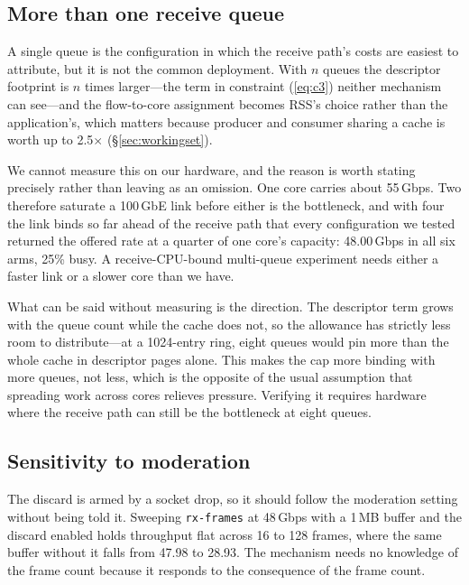 \documentclass[letterpaper,twocolumn,10pt]{article}
\newcommand{\rxframes}{\texttt{rx-frames}\xspace}
\begin{document}


\subsection{More than one receive queue}

A single queue is the configuration in which the receive path's costs are
easiest to attribute, but it is not the common deployment. With $n$ queues the
descriptor footprint is $n$ times larger---the term in constraint (\ref{eq:c3})
neither mechanism can see---and the flow-to-core assignment becomes RSS's choice
rather than the application's, which matters because producer and consumer
sharing a cache is worth up to 2.5$\times$ (\S\ref{sec:workingset}).

We cannot measure this on our hardware, and the reason is worth stating
precisely rather than leaving as an omission. One core carries about 55\,Gbps.
Two therefore saturate a 100\,GbE link before either is the bottleneck, and with
four the link binds so far ahead of the receive path that every configuration we
tested returned the offered rate at a quarter of one core's capacity: 48.00\,Gbps
in all six arms, 25\% busy. A receive-CPU-bound multi-queue experiment needs
either a faster link or a slower core than we have.

What can be said without measuring is the direction. The descriptor term grows
with the queue count while the cache does not, so the allowance has strictly
less room to distribute---at a 1024-entry ring, eight queues would pin more than
the whole cache in descriptor pages alone. This makes the cap more binding with
more queues, not less, which is the opposite of the usual assumption that
spreading work across cores relieves pressure. Verifying it requires hardware
where the receive path can still be the bottleneck at eight queues.

\subsection{Sensitivity to moderation}

The discard is armed by a socket drop, so it should follow the moderation
setting without being told it. Sweeping \rxframes at 48\,Gbps with a 1\,MB
buffer and the discard enabled holds throughput flat across 16 to 128 frames,
where the same buffer without it falls from 47.98 to 28.93. The mechanism needs
no knowledge of the frame count because it responds to the consequence of the
frame count.
\end{document}
